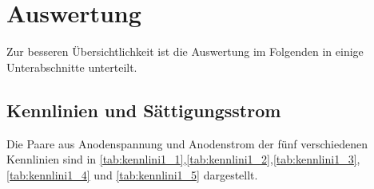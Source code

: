 \section{Auswertung}
\label{sec:auswertung}

Zur besseren Übersichtlichkeit ist die Auswertung im Folgenden in einige Unterabschnitte unterteilt.

\subsection{Kennlinien und Sättigungsstrom}

Die Paare aus Anodenspannung und Anodenstrom der fünf verschiedenen Kennlinien sind in \autoref{tab:kennlini1_1},\autoref{tab:kennlini1_2},\autoref{tab:kennlini1_3},\autoref{tab:kennlini1_4} und \autoref{tab:kennlini1_5} dargestellt.

